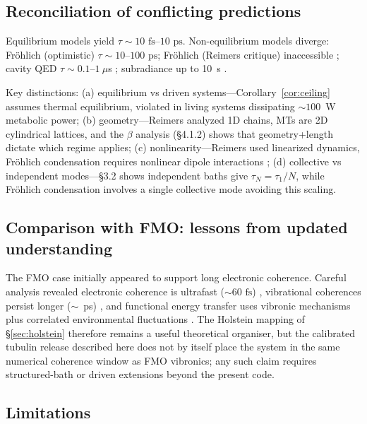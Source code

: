 \documentclass[twocolumn,10pt]{article}
\newcommand{\ps}{\text{~ps}}
\newcommand{\fs}{\text{~fs}}
\begin{document}
\subsection{Reconciliation of conflicting predictions}

Equilibrium models \cite{Tegmark2000,Hagan2002,Xiang2019} yield
$\tau \sim 10\fs\text{--}10\ps$. Non-equilibrium models diverge: Fr\"ohlich
(optimistic) $\tau \sim 10\text{--}100\ps$; Fr\"ohlich (Reimers critique)
inaccessible \cite{Reimers2009}; cavity QED $\tau \sim 0.1\text{--}1~\mu$s
\cite{Mavromatos2025}; subradiance up to 10~s \cite{Babcock2024}.

Key distinctions: (a) equilibrium vs driven systems---Corollary~\ref{cor:ceiling}
assumes thermal equilibrium, violated in living systems dissipating
$\sim 100$~W metabolic power; (b) geometry---Reimers \cite{Reimers2009}
analyzed 1D chains, MTs are 2D cylindrical lattices, and the $\beta$
analysis (\S 4.1.2) shows that geometry+length dictate which regime
applies; (c) nonlinearity---Reimers used linearized dynamics, Fr\"ohlich
condensation requires nonlinear dipole interactions \cite{Pokorn2011};
(d) collective vs independent modes---\S 3.2 shows independent baths give
$\tau_N = \tau_1/N$, while Fr\"ohlich condensation involves a single
collective mode avoiding this scaling.


\subsection{Comparison with FMO: lessons from updated understanding}

The FMO case initially appeared to support long electronic coherence.
Careful analysis revealed electronic coherence is ultrafast ($\sim 60\fs$)
\cite{Duan2017,Thyrhaug2018}, vibrational coherences persist longer
($\sim$~ps) \cite{Thyrhaug2018}, and functional energy transfer uses
vibronic mechanisms plus correlated environmental fluctuations
\cite{Dean2017,Cao2020,Chin2013}. The Holstein mapping of
\S\ref{sec:holstein} therefore remains a useful theoretical organiser, but
the calibrated tubulin release described here does not by itself place the
system in the same numerical coherence window as FMO vibronics; any such
claim requires structured-bath or driven extensions beyond the present code.


\subsection{Limitations}
\end{document}
